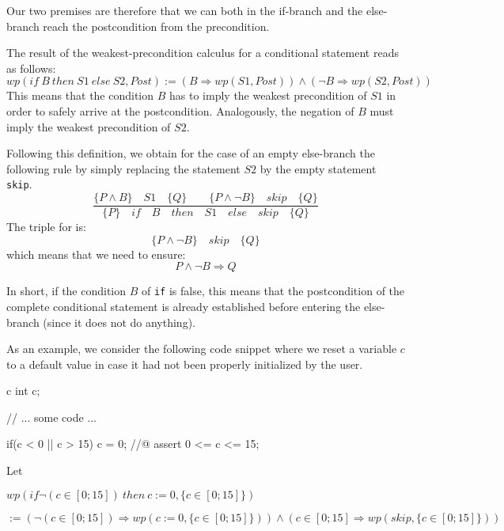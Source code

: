 Our two premises are therefore that we can both in the if-branch and the
else-branch reach the postcondition from the precondition.

The result of the weakest-precondition calculus for a conditional
statement reads as follows:
$$wp(if\ B\ then\ S1\ else\ S2 , Post) := (B \Rightarrow wp(S1, Post)) \wedge (\neg B \Rightarrow wp(S2, Post))$$
This means that the condition $B$ has to imply the weakest
precondition of $S1$ in order to safely arrive at the postcondition.
Analogously, the negation of $B$ must imply the weakest precondition
of $S2$.





Following this definition, we obtain for the case of an empty else-branch the
following rule by simply replacing the statement $S2$ by the empty
statement \texttt{skip}.
$$\dfrac{\{P \wedge B\}\quad S1\quad \{Q\} \quad \quad \{P \wedge \neg B\}\quad skip\quad \{Q\}}{\{P\}\quad if\quad B\quad then\quad S1\quad else\quad skip \quad \{Q\}}$$
The triple for  is:
$$\{P \wedge \neg B\}\quad skip\quad \{Q\}$$
which means that we need to ensure:
$$P \wedge \neg B \Rightarrow Q$$

In short, if the condition $B$ of \texttt{if} is false, this means
that the postcondition of the complete conditional statement is already
established before entering the else-branch (since it does not do
anything).



As an example, we consider the following code snippet where we reset a
variable $c$ to a default value in case it had not been properly
initialized by the user.



\begin{CodeBlock}{c}
int c;

// ... some code ...

if(c < 0 || c > 15){
  c = 0;
}
//@ assert 0 <= c <= 15;
\end{CodeBlock}



Let



$wp(if \neg (c \in [0;15])\ then\ c := 0, \{c \in [0;15]\})$



$:= (\neg (c \in [0;15])\Rightarrow wp(c := 0, \{c \in [0;15]\})) \wedge (c \in [0;15]\Rightarrow wp(skip, \{c \in [0;15]\}))$



